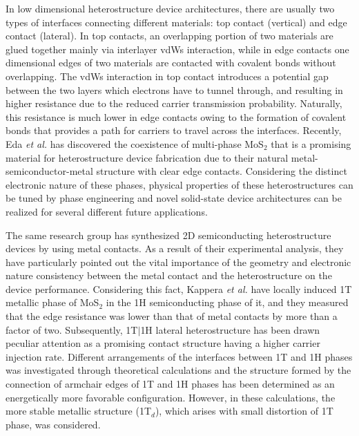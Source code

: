 In low dimensional heterostructure device architectures, there are usually two types of interfaces connecting different materials: top contact (vertical) and edge contact (lateral)\cite{Allain2015}. In top contacts, an overlapping portion of two materials are glued together mainly via interlayer vdWs interaction, while in edge contacts one dimensional edges of two materials are contacted with covalent bonds without overlapping. The vdWs interaction in top contact introduces a potential gap between the two layers which electrons have to tunnel through, and resulting in higher resistance due to the reduced carrier transmission probability. Naturally, this resistance is much lower in edge contacts owing to the formation of covalent bonds that provides a path for carriers to travel across the interfaces\cite{Matsuda2010,Kang2014}. Recently, Eda \textit{et al.}  has discovered the coexistence of multi-phase MoS$_2$ that is a promising material for heterostructure device fabrication due to their natural metal-semiconductor-metal structure with clear edge contacts\cite{Eda2012}. Considering the distinct electronic nature of these phases, physical properties of these heterostructures\cite{Kappera2014,Fan2015} can be tuned by phase engineering and novel solid-state device architectures can be realized for several different future applications.

The same research group has synthesized 2D semiconducting heterostructure devices\cite{Huang2014,Zhang2015} by using metal contacts. As a result of their experimental analysis, they have particularly pointed out the vital importance of the geometry and electronic nature consistency between the metal contact and the heterostructure on the device performance\cite{Bai2013,Eda2012}. Considering this fact, Kappera \textit{et al.}\cite{Kappera2014} have locally induced 1T metallic phase of MoS$_2$ in the 1H semiconducting phase of it, and they measured that the edge resistance was lower than that of metal contacts by more than a factor of two. Subsequently, 1T$\mid$1H lateral heterostructure has been drawn peculiar attention as a promising contact structure having a higher carrier injection rate. Different arrangements of the interfaces between 1T and 1H phases was investigated through theoretical calculations\cite{Hu2015,Sivaraman2016} and the structure formed by the connection of armchair edges of 1T and 1H phases has been determined as an energetically more favorable configuration. However, in these calculations, the more stable metallic structure (1T$_d$), which arises with small distortion of 1T phase, was considered.

